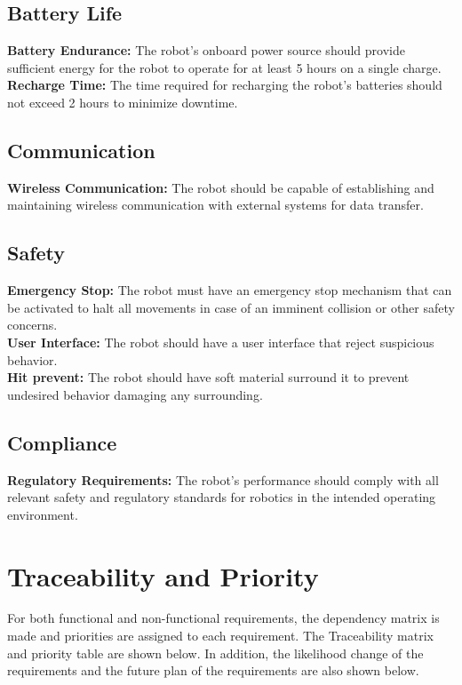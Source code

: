 \documentclass[12pt]{article}
\begin{document}
\subsection{Battery Life}
\noindent\textbf{Battery Endurance:} The robot's onboard power source should provide sufficient energy for the robot to operate for at least 5 hours on a single charge.\\
\noindent\textbf{Recharge Time:} The time required for recharging the robot's batteries should not exceed 2 hours to minimize downtime.\\
\subsection{Communication}
\noindent\textbf{Wireless Communication:} The robot should be capable of establishing and maintaining wireless communication with external systems for data transfer.\\

\subsection{Safety}
\noindent\textbf{Emergency Stop:} The robot must have an emergency stop mechanism that can be activated to halt all movements in case of an imminent collision or other safety concerns.\\
\noindent\textbf{User Interface:} The robot should have a user interface that reject suspicious behavior.\\
\noindent\textbf{Hit prevent:} The robot should have soft material surround it to prevent undesired behavior damaging any surrounding.\\

\subsection{Compliance}
\noindent\textbf{Regulatory Requirements:} The robot's performance should comply with all relevant safety and regulatory standards for robotics in the intended operating environment.




\section{Traceability and Priority}
For both functional and non-functional requirements, the dependency matrix is made and priorities are assigned to each requirement. The Traceability matrix and priority table are shown below. In addition, the likelihood change of the requirements and the future plan of the requirements are also shown below.
\end{document}
